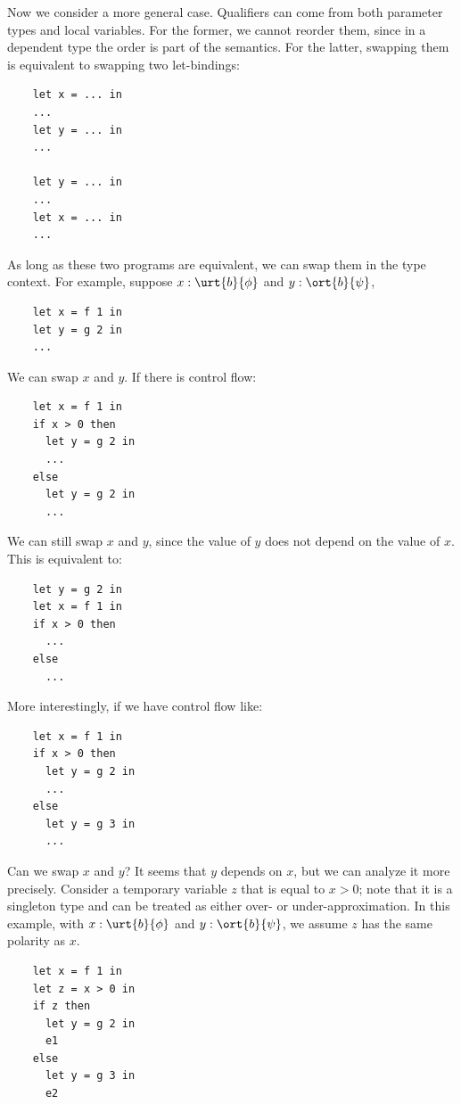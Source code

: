Now we consider a more general case. Qualifiers can come from both parameter types and local variables. For the former, we cannot reorder them, since in a dependent type the order is part of the semantics. For the latter, swapping them is equivalent to swapping two let-bindings:
\begin{verbatim}
    let x = ... in
    ...
    let y = ... in
    ...

    let y = ... in
    ...
    let x = ... in
    ...
\end{verbatim}
As long as these two programs are equivalent, we can swap them in the type context. For example, suppose $x:\urt{b}{\phi}$ and $y:\ort{b}{\psi}$,
\begin{verbatim}
    let x = f 1 in
    let y = g 2 in
    ...
\end{verbatim}
We can swap $x$ and $y$. If there is control flow:
\begin{verbatim}
    let x = f 1 in
    if x > 0 then
      let y = g 2 in
      ...
    else
      let y = g 2 in
      ...
\end{verbatim}
We can still swap $x$ and $y$, since the value of $y$ does not depend on the value of $x$. This is equivalent to:
\begin{verbatim}
    let y = g 2 in
    let x = f 1 in
    if x > 0 then
      ...
    else
      ...
\end{verbatim}
More interestingly, if we have control flow like:
\begin{verbatim}
    let x = f 1 in
    if x > 0 then
      let y = g 2 in
      ...
    else
      let y = g 3 in
      ...
\end{verbatim}
Can we swap $x$ and $y$? It seems that $y$ depends on $x$, but we can analyze it more precisely. Consider a temporary variable $z$ that is equal to $x > 0$; note that it is a singleton type and can be treated as either over- or under-approximation. In this example, with $x:\urt{b}{\phi}$ and $y:\ort{b}{\psi}$, we assume $z$ has the same polarity as $x$.
\begin{verbatim}
    let x = f 1 in
    let z = x > 0 in
    if z then
      let y = g 2 in
      e1
    else
      let y = g 3 in
      e2
\end{verbatim}
